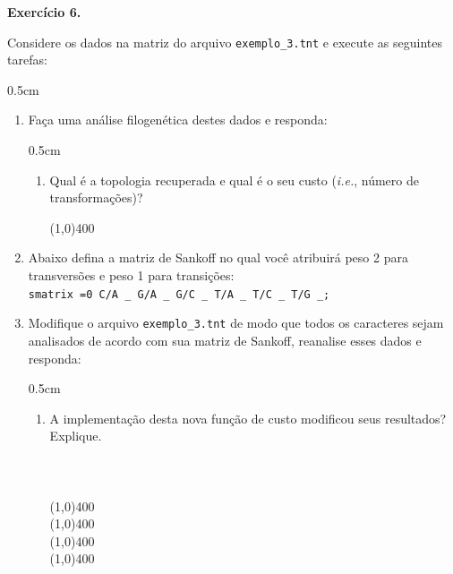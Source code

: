 \begin{refsection}

\begin{blackBlock}{\textbf{Exercício 6.}}\label{tut6:ex:6.3}

Considere os dados na matriz do arquivo \texttt{exemplo\_3.tnt} e execute as seguintes tarefas:

\end{blackBlock}

\begin {myindentpar}{0.5cm}
\begin{enumerate}[\itshape i.]
	\item{Faça uma análise filogenética destes dados e responda:}\\
		\begin {myindentpar}{0.5cm}
		\begin{enumerate}[\itshape a.]
		  \item{Qual é a topologia recuperada e qual é o seu custo (\textit{i.e.}, número de transformações)?}
\vspace{100pt}

		\line(1,0){400}\\
		\end{enumerate}
		\end{myindentpar}
	\item{Abaixo defina a matriz de Sankoff no qual você atribuirá peso 2 para transversões e peso 1 para transições:}\\
\texttt{smatrix =0  C/A \_ G/A \_ G/C \_ T/A \_ T/C \_ T/G \_;}\\

	\item{Modifique o arquivo \texttt{exemplo\_3.tnt} de modo que todos os caracteres sejam analisados de acordo com sua matriz de Sankoff, reanalise esses dados e responda:}\\
		\begin {myindentpar}{0.5cm}
		\begin{enumerate}[\itshape a.]
		  \item{A implementação desta nova função de custo modificou seus resultados? Explique.}
		  \\
		  \\
		  \\
		  \\
		\line(1,0){400}\\
		\line(1,0){400}\\
		\line(1,0){400}\\
		\line(1,0){400}\\


\end{enumerate}
\end{myindentpar}
\end{enumerate}
\end{myindentpar}
\end{refsection}
